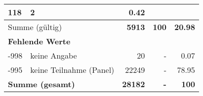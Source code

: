 \begin{longtable}{lXrrr}
       \num{118} &
       \num[round-mode=places,round-precision=2]{2} &
         \num[round-mode=places,round-precision=2]{0,42} \\
     \midrule
     \multicolumn{2}{l}{Summe (gültig)} &
       \textbf{\num{5913}} &
     \textbf{100} &
       \textbf{\num[round-mode=places,round-precision=2]{20,98}} \\
     \multicolumn{5}{l}{\textbf{Fehlende Werte}}\\
       -998 &
       keine Angabe &
         \num{20} &
        - &
         \num[round-mode=places,round-precision=2]{0,07} \\
       -995 &
       keine Teilnahme (Panel) &
         \num{22249} &
        - &
         \num[round-mode=places,round-precision=2]{78,95} \\
     \midrule
     \multicolumn{2}{l}{\textbf{Summe (gesamt)}} &
          \textbf{\num{28182}} &
        \textbf{-} &
        \textbf{100} \\
     \bottomrule
     \end{longtable}
     
